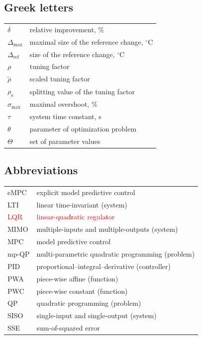 \documentclass[preprint,12pt]{elsarticle}
\newcommand{\change}[1]{\textcolor{red}{#1}}
\begin{document}
	\subsection{Greek letters}
		\begin{tabular}{ l l }
			$\delta$ & relative improvement, \% \\
			$\Delta_\mathrm{max}$ & maximal size of the reference change, $^{\circ}\mathrm{C}$  \\
			$\Delta_\mathrm{ref}$ & size of the reference change, $^{\circ}\mathrm{C}$ \\
			$\rho$ & tuning factor \\
			$\widetilde{\rho}$ & scaled tuning factor \\
			$\rho_{\mathrm{s}}$ & splitting value of the tuning factor \\
			$\sigma_{\max}$ & maximal overshoot, \% \\
			$\tau$ & system time constant, s\\
			$\theta$ & parameter of optimization problem \\
			$\Theta$ & set of parameter values
		\end{tabular}
	
	\subsection*{Abbreviations}
		\begin{tabular}{ l l }
			eMPC & explicit model predictive control \\			
			LTI  & linear time-invariant (system) \\
			\change{LQR} & \change{linear-quadratic regulator} \\
			MIMO & multiple-inputs and multiple-outputs (system) \\
			MPC  & model predictive control \\
			mp-QP& multi-parametric quadratic programming (problem) \\
			PID  & proportional–integral–derivative (controller) \\
			PWA  & piece-wise affine (function) \\
			PWC  & piece-wise constant (function) \\
			QP   & quadratic programming (problem) \\
			SISO & single-input and single-output (system) \\
			SSE  & sum-of-squared error 
		\end{tabular}
	
\end{document}
